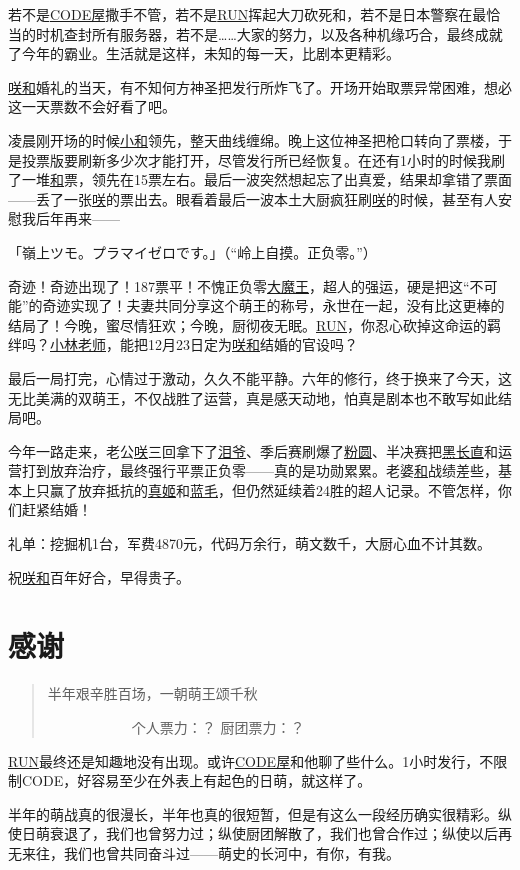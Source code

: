 若不是\uline{CODE屋}撒手不管，若不是\uline{RUN}挥起大刀砍死和，若不是日本警察在最恰当的时机查封所有服务器，若不是……大家的努力，以及各种机缘巧合，最终成就了今年的霸业。生活就是这样，未知的每一天，比剧本更精彩。

\uline{咲}\uline{和}婚礼的当天，有不知何方神圣把发行所炸飞了。开场开始取票异常困难，想必这一天票数不会好看了吧。

凌晨刚开场的时候\uline{小和}领先，整天曲线缠绵。晚上这位神圣把枪口转向了票楼，于是投票版要刷新多少次才能打开，尽管发行所已经恢复。在还有1小时的时候我刷了一堆\uline{和}票，领先在15票左右。最后一波突然想起忘了出真爱，结果却拿错了票面——丢了一张\uline{咲}的票出去。眼看着最后一波本土大厨疯狂刷\uline{咲}的时候，甚至有人安慰我后年再来——

「嶺上ツモ。プラマイゼロです。」（“岭上自摸。正负零。”）

奇迹！奇迹出现了！187票平！不愧正负零\uline{大魔王}，超人的强运，硬是把这“不可能”的奇迹实现了！夫妻共同分享这个萌王的称号，永世在一起，没有比这更棒的结局了！今晚，蜜尽情狂欢；今晚，厨彻夜无眠。\uline{RUN}，你忍心砍掉这命运的羁绊吗？\uline{小林老师}，能把12月23日定为\uline{咲}\uline{和}结婚的官设吗？

最后一局打完，心情过于激动，久久不能平静。六年的修行，终于换来了今天，这无比美满的双萌王，不仅战胜了运营，真是感天动地，怕真是剧本也不敢写如此结局吧。

今年一路走来，老公\uline{咲}三回拿下了\uline{泪爷}、季后赛刷爆了\uline{粉圆}、半决赛把\uline{黑长直}和运营打到放弃治疗，最终强行平票正负零——真的是功勋累累。老婆\uline{和}战绩差些，基本上只赢了放弃抵抗的\uline{真姬}和\uline{蓝毛}，但仍然延续着24胜的超人记录。不管怎样，你们赶紧结婚！

礼单：挖掘机1台，军费4870元，代码万余行，萌文数千，大厨心血不计其数。

祝\uline{咲}\uline{和}百年好合，早得贵子。

\chapter{感谢}
\begin{quote}
半年艰辛胜百场，一朝萌王颂千秋

　　　　　　个人票力：？ 厨团票力：？
\end{quote}

\uline{RUN}最终还是知趣地没有出现。或许\uline{CODE屋}和他聊了些什么。1小时发行，不限制CODE，好容易至少在外表上有起色的日萌，就这样了。

半年的萌战真的很漫长，半年也真的很短暂，但是有这么一段经历确实很精彩。纵使日萌衰退了，我们也曾努力过；纵使厨团解散了，我们也曾合作过；纵使以后再无来往，我们也曾共同奋斗过——萌史的长河中，有你，有我。

